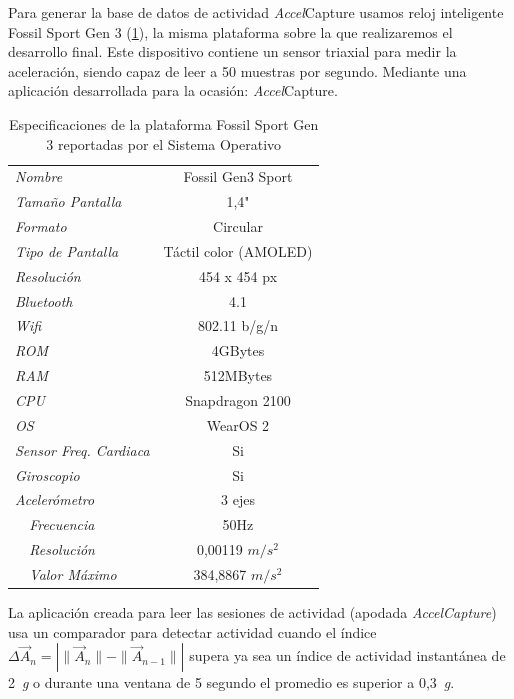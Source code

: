 \documentclass[11pt,a4paper,spanish,twocolumn]{article}
\def\accelcapture/{\textsl{\textsf{Accel}}\textsf{Capture}}
\def\g/{~\textsl{g}}
\begin{document}
Para generar la base de datos de actividad \accelcapture/ usamos reloj inteligente Fossil Sport Gen 3 (\ref{tab:watch:specs}), la misma plataforma sobre la que realizaremos el desarrollo final. Este dispositivo contiene un sensor triaxial para medir la aceleración, siendo capaz de leer a 50 muestras por segundo. Mediante una aplicación desarrollada para la ocasión: \accelcapture/.

\begin{table}\caption{\label{tab:watch:specs} Especificaciones de la plataforma Fossil Sport Gen 3 reportadas por el Sistema Operativo}
	\begin{tabular}{lc}\toprule
  \emph{Nombre}              & Fossil Gen3 Sport \\
\emph{Tamaño Pantalla}     & 1,4" \\
\emph{Formato}              & Circular \\
\emph{Tipo de Pantalla}    & Táctil color (AMOLED) \\
\emph{Resolución}          & 454 x 454 px \\
\emph{Bluetooth}           & 4.1 \\
\emph{Wifi}                & 802.11 b/g/n \\
\emph{ROM}                 & 4GBytes \\
\emph{RAM}                 & 512MBytes \\
\emph{CPU}                 & Snapdragon 2100 \\
\emph{OS}                  & WearOS 2 \\
\emph{Sensor Freq. Cardiaca} & Si \\
\emph{Giroscopio}          & Si \\
\emph{Acelerómetro}         & 3 ejes \\
\emph{~~Frecuencia}         & 50Hz \\
\emph{~~Resolución}					& 0,00119 $m/s^2$ \\
\emph{~~Valor Máximo}				& 384,8867 $m/s^2$\\ \bottomrule
\end{tabular}
\end{table}

La aplicación creada para leer las sesiones de actividad (apodada \emph{AccelCapture}) usa un comparador para detectar actividad cuando el índice $\Delta \vec{A}_n = |\|\vec{A}_n\| -\|\vec{A }_{n-1}\||$ supera ya sea un índice de actividad instantánea de 2\g/ o durante una ventana de 5 segundo el promedio es superior a 0,3\g/.
\end{document}
